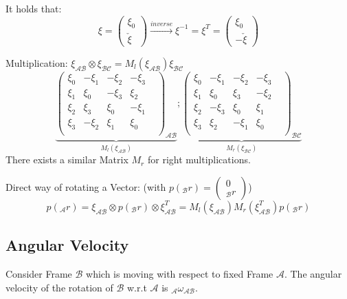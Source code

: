 \documentclass[fontsize=6pt,DIV=calc,a4paper,ngerman]{scrartcl}
\begin{document}
\begin{multicols*}{4}
	It holds that:
	$$\xi = \begin{pmatrix}\xi_0 \\ \check{\xi}\end{pmatrix} \xrightarrow[]{inverse} \xi^{-1} = \xi^T =\begin{pmatrix}\xi_0 \\ -\check{\xi}\end{pmatrix}$$

	Multiplication: $ \xi_\mathcal{AB}\otimes \xi_\mathcal{BC} = M_l(\xi_\mathcal{AB}) \xi_\mathcal{BC}$
	$$
		\underbrace{\left(\begin{smallmatrix}
					\xi_0 & -\xi_1 & -\xi_2 & -\xi_3 \\
					\xi_1 & \xi_0 & -\xi_3 & \xi_2 \\
					\xi_2 & \xi_3 & \xi_0 & -\xi_1 \\
					\xi_3 & -\xi_2 & \xi_1 & \xi_0 & \\
				\end{smallmatrix}\right)_\mathcal{AB} }_{M_l(\xi_\mathcal{AB})}
		;
		\underbrace{\left(\begin{smallmatrix}
					\xi_0 & -\xi_1 & -\xi_2 & -\xi_3 \\
					\xi_1 & \xi_0 & \xi_3 & -\xi_2 \\
					\xi_2 & -\xi_3 & \xi_0 & \xi_1 \\
					\xi_3 & \xi_2 & -\xi_1 & \xi_0 & \\
				\end{smallmatrix}\right)_\mathcal{BC} }_{M_r(\xi_\mathcal{BC})}
	$$
	There exists a similar Matrix $M_r$ for right multiplications.

	\smallskip
	Direct way of rotating a Vector: (with $p({}_\mathcal{B}r)= \left(\begin{smallmatrix} 0 \\ {}_\mathcal{B}r\end{smallmatrix}\right)$)
	$$p({}_\mathcal{A}r)
		=\xi_\mathcal{AB} \otimes p({}_\mathcal{B}r) \otimes \xi^T_\mathcal{AB}
		=M_l(\xi_\mathcal{AB})M_r(\xi_\mathcal{AB}^T)p({}_\mathcal{B}r)$$

	\subsection{Angular Velocity}
	Consider Frame $\mathcal{B}$ which is moving with respect to fixed Frame $\mathcal{A}$. The angular velocity of the rotation of $\mathcal{B}$ w.r.t $\mathcal{A}$ is ${}_\mathcal{A}\omega_\mathcal{AB}$.


\end{multicols*}
\end{document}
